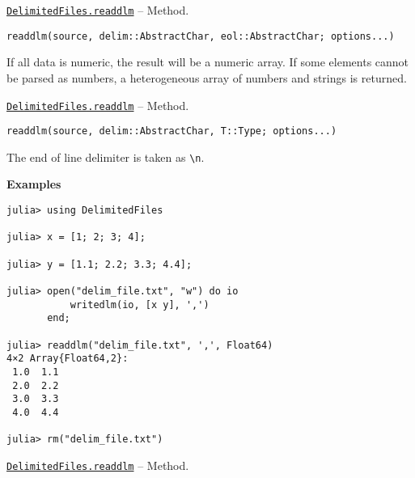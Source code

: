 \hypertarget{1307762155632158750}{} 
\hyperlink{1307762155632158750}{\texttt{DelimitedFiles.readdlm}}  -- {Method.}

\begin{adjustwidth}{2em}{0pt}


\begin{verbatim}
readdlm(source, delim::AbstractChar, eol::AbstractChar; options...)
\end{verbatim}

If all data is numeric, the result will be a numeric array. If some elements cannot be parsed as numbers, a heterogeneous array of numbers and strings is returned.



\end{adjustwidth}
\hypertarget{11851910953015558329}{} 
\hyperlink{11851910953015558329}{\texttt{DelimitedFiles.readdlm}}  -- {Method.}

\begin{adjustwidth}{2em}{0pt}


\begin{verbatim}
readdlm(source, delim::AbstractChar, T::Type; options...)
\end{verbatim}

The end of line delimiter is taken as \texttt{{\textbackslash}n}.

\textbf{Examples}


\begin{verbatim}
julia> using DelimitedFiles

julia> x = [1; 2; 3; 4];

julia> y = [1.1; 2.2; 3.3; 4.4];

julia> open("delim_file.txt", "w") do io
           writedlm(io, [x y], ',')
       end;

julia> readdlm("delim_file.txt", ',', Float64)
4×2 Array{Float64,2}:
 1.0  1.1
 2.0  2.2
 3.0  3.3
 4.0  4.4

julia> rm("delim_file.txt")
\end{verbatim}



\end{adjustwidth}
\hypertarget{14088726821151253916}{} 
\hyperlink{14088726821151253916}{\texttt{DelimitedFiles.readdlm}}  -- {Method.}

